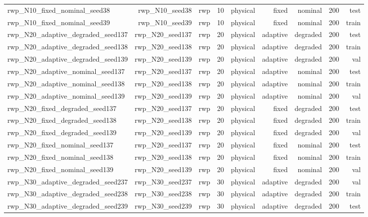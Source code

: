 \begin{tabular}{lrrrrrrrr}
rwp\_N10\_fixed\_nominal\_seed38 & rwp\_N10\_seed38 & rwp & 10 & physical & fixed & nominal & 200 & test \\
rwp\_N10\_fixed\_nominal\_seed39 & rwp\_N10\_seed39 & rwp & 10 & physical & fixed & nominal & 200 & train \\
rwp\_N20\_adaptive\_degraded\_seed137 & rwp\_N20\_seed137 & rwp & 20 & physical & adaptive & degraded & 200 & test \\
rwp\_N20\_adaptive\_degraded\_seed138 & rwp\_N20\_seed138 & rwp & 20 & physical & adaptive & degraded & 200 & train \\
rwp\_N20\_adaptive\_degraded\_seed139 & rwp\_N20\_seed139 & rwp & 20 & physical & adaptive & degraded & 200 & val \\
rwp\_N20\_adaptive\_nominal\_seed137 & rwp\_N20\_seed137 & rwp & 20 & physical & adaptive & nominal & 200 & test \\
rwp\_N20\_adaptive\_nominal\_seed138 & rwp\_N20\_seed138 & rwp & 20 & physical & adaptive & nominal & 200 & train \\
rwp\_N20\_adaptive\_nominal\_seed139 & rwp\_N20\_seed139 & rwp & 20 & physical & adaptive & nominal & 200 & val \\
rwp\_N20\_fixed\_degraded\_seed137 & rwp\_N20\_seed137 & rwp & 20 & physical & fixed & degraded & 200 & test \\
rwp\_N20\_fixed\_degraded\_seed138 & rwp\_N20\_seed138 & rwp & 20 & physical & fixed & degraded & 200 & train \\
rwp\_N20\_fixed\_degraded\_seed139 & rwp\_N20\_seed139 & rwp & 20 & physical & fixed & degraded & 200 & val \\
rwp\_N20\_fixed\_nominal\_seed137 & rwp\_N20\_seed137 & rwp & 20 & physical & fixed & nominal & 200 & test \\
rwp\_N20\_fixed\_nominal\_seed138 & rwp\_N20\_seed138 & rwp & 20 & physical & fixed & nominal & 200 & train \\
rwp\_N20\_fixed\_nominal\_seed139 & rwp\_N20\_seed139 & rwp & 20 & physical & fixed & nominal & 200 & val \\
rwp\_N30\_adaptive\_degraded\_seed237 & rwp\_N30\_seed237 & rwp & 30 & physical & adaptive & degraded & 200 & val \\
rwp\_N30\_adaptive\_degraded\_seed238 & rwp\_N30\_seed238 & rwp & 30 & physical & adaptive & degraded & 200 & train \\
rwp\_N30\_adaptive\_degraded\_seed239 & rwp\_N30\_seed239 & rwp & 30 & physical & adaptive & degraded & 200 & test \\

\end{tabular}
